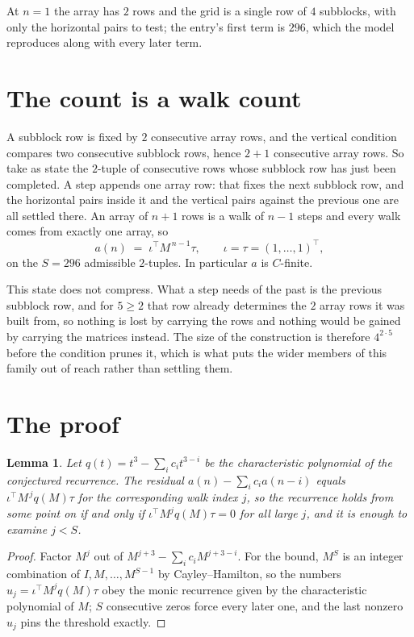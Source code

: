 \documentclass[11pt,a4paper]{article}
\theoremstyle{plain}
\newtheorem{lemma}[theorem]{Lemma}
\theoremstyle{definition}
\begin{document}
At $n=1$ the array has $2$ rows and the grid is a single row of $4$
subblocks, with only the horizontal pairs to test; the entry's first term is
$296$, which the model reproduces along with every later term.

\section{The count is a walk count}

A subblock row is fixed by $2$ consecutive array rows, and the vertical condition compares
two consecutive subblock rows, hence $2+1$ consecutive array rows. So take as state the
$2$-tuple of consecutive rows whose subblock row has just been completed. A step appends one
array row: that fixes the next subblock row, and the horizontal pairs inside it and the
vertical pairs against the previous one are all settled there. An array of $n+1$ rows is
a walk of $n-1$ steps and every walk comes from exactly one array, so
\[
a(n)\;=\;\iota^{\!\top}M^{\,n-1}\tau,\qquad\iota=\tau=(1,\dots,1)^{\!\top},
\]
on the $S=296$ admissible $2$-tuples. In particular $a$ is $C$-finite.

This state does not compress. What a step needs of the past is the previous subblock row, and
for $5\ge2$ that row already determines the $2$ array rows it was built from, so nothing
is lost by carrying the rows and nothing would be gained by carrying the matrices instead. The
size of the construction is therefore $4^{2\cdot5}$ before the condition prunes
it, which is what puts the wider members of this family out of reach rather than settling them.

\section{The proof}

\begin{lemma}\label{lem:crit}
Let $q(t)=t^{3}-\sum_i c_it^{3-i}$ be the characteristic polynomial of the
conjectured recurrence. The residual $a(n)-\sum_ic_ia(n-i)$ equals
$\iota^{\!\top}M^{\,j}q(M)\tau$ for the corresponding walk index $j$, so the recurrence
holds from some point on if and only if $\iota^{\!\top}M^{j}q(M)\tau=0$ for all large $j$,
and it is enough to examine $j<S$.
\end{lemma}

\begin{proof}
Factor $M^{j}$ out of $M^{j+3}-\sum_ic_iM^{j+3-i}$. For the bound, $M^{S}$
is an integer combination of $I,M,\dots,M^{S-1}$ by Cayley--Hamilton, so the numbers
$u_j=\iota^{\!\top}M^{j}q(M)\tau$ obey the monic recurrence given by the characteristic
polynomial of $M$; $S$ consecutive zeros force every later one, and the last nonzero $u_j$
pins the threshold exactly.
\end{proof}
\end{document}
